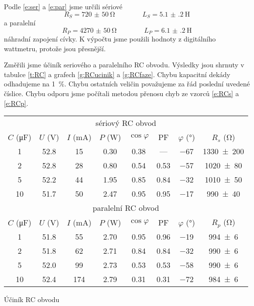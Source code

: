 Podle \eqref{e:ser} a \eqref{e:par} jsme určili sériové
\begin{equation*}
R_S=\SI{720(50)}{\ohm} \qquad \qquad L_S=\SI{5.1(2)}{\henry}
\end{equation*}
a paralelní
\begin{equation*}
R_P=\SI{4270(50)}{\ohm} \qquad \qquad L_P=\SI{6.1(2)}{\henry}
\end{equation*}
náhradní zapojení cívky. K výpočtu jsme použili hodnoty z digitálního wattmetru, protože jsou přesnější.

Změřili jsme účiník seriového a paralelního RC obvodu.
Výsledky jsou shrnuty v tabulce \ref{t:RC} a grafech \ref{g:RCucinik} a \ref{g:RCfaze}.
Chybu kapacitní dekády odhadujeme na \SI{1}{\percent}.
Chybu ostatních veličin považujeme za řád poslední uvedené číslice.
Chybu odporu jsme počítali metodou přenosu chyb ze vzorců \eqref{e:RCs} a \eqref{e:RCp}.

\begin{tabulka}[htbp]
\centering
\begin{tabular}{ccccccc|c}
\multicolumn{8}{c}{sériový RC obvod} \\
$C$ (\si{\micro\farad}) & $U$ (\si{\volt}) & $I$ (\si{\milli\ampere}) & $P$ (\si{\watt}) & $\cos \varphi$ & PF & $\varphi$ (\si{\degree}) &  $R_s$ (\si{\ohm})    \\ \hline
\num{1} & \num{52.8} & \num{15} & \num{0.30} & \num{0.38} & --- & \num{-67} & \num{1330(200)} \\
\num{2} & \num{52.8} & \num{28} & \num{0.80} & \num{0.54} & \num{0.53} & \num{-57} & \num{1020(80)} \\
\num{5} & \num{52.2} & \num{44} & \num{1.95} & \num{0.85} & \num{0.84} & \num{-32} & \num{1010(50)} \\
\num{10} & \num{51.7} & \num{50} & \num{2.47} & \num{0.95} & \num{0.95} & \num{-17} & \num{990(40)} \\
\hline \hline
\multicolumn{8}{c}{paralelní RC obvod} \\
$C$ (\si{\micro\farad}) & $U$ (\si{\volt}) & $I$ (\si{\milli\ampere}) & $P$ (\si{\watt}) & $\cos \varphi$ & PF & $\varphi$ (\si{\degree}) & $R_p$ (\si{\ohm}) \\ \hline
\num{1} & \num{51.8} & \num{55} & \num{2.70} & \num{0.95} & \num{0.96} & \num{-19} & \num{994(6)} \\
\num{2} & \num{51.8} & \num{62} & \num{2.71} & \num{0.84} & \num{0.84} & \num{-32} & \num{990(6)} \\
\num{5} & \num{52.0} & \num{99} & \num{2.73} & \num{0.53} & \num{0.53} & \num{-58} & \num{990(6)} \\
\num{10} & \num{52.4} & \num{174} & \num{2.79} & \num{0.31} & \num{0.31} & \num{-72} & \num{984(6)} \\

\end{tabular}
\caption{Účiník RC obvodu}
\label{t:RC}
\end{tabulka}

